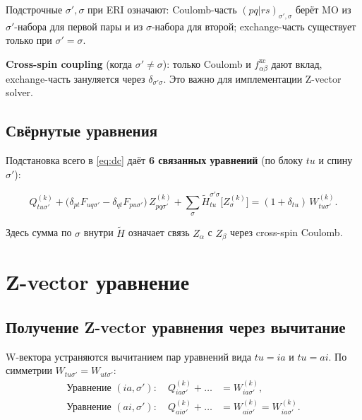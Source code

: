 \documentclass[11pt, a4paper]{article}
\theoremstyle{definition}
\newcommand{\Zk}[2]{Z^{(#1)}_{#2}}
\newcommand{\Wk}[2]{W^{(#1)}_{#2}}
\newcommand{\xc}{\text{xc}}
\begin{document}
Подстрочные $\sigma', \sigma$ при ERI означают: Coulomb-часть $(pq|rs)_{\sigma', \sigma}$ берёт MO из $\sigma'$-набора для первой пары и из $\sigma$-набора для второй; exchange-часть существует только при $\sigma' = \sigma$.

\textbf{Cross-spin coupling} (когда $\sigma' \ne \sigma$): только Coulomb и $f^{\xc}_{\alpha\beta}$ дают вклад, exchange-часть зануляется через $\delta_{\sigma'\sigma}$. Это важно для имплементации Z-vector solver.

\subsection{Свёрнутые уравнения}

Подстановка всего в \eqref{eq:dc} даёт \textbf{6 связанных уравнений} (по блоку $tu$ и спину $\sigma'$):

\begin{equation}
    \boxed{\;
    Q^{(k)}_{tu\sigma'} + \bigl( \delta_{pt} F_{uq\sigma'} - \delta_{qt} F_{pu\sigma'} \bigr)\, \Zk{k}{pq\sigma'} + \sum_\sigma \tilde H^{\sigma'\sigma}_{tu}\bigl[\Zk{k}{\sigma}\bigr] = (1 + \delta_{tu})\, \Wk{k}{tu\sigma'}.
    \;}
    \label{eq:master}
\end{equation}

Здесь сумма по $\sigma$ внутри $\tilde H$ означает связь $Z_\alpha$ с $Z_\beta$ через cross-spin Coulomb.

\section{Z-vector уравнение}
\label{sec:zvector}

\subsection{Получение Z-vector уравнения через вычитание}

W-вектора устраняются вычитанием пар уравнений вида $tu = ia$ и $tu = ai$. По симметрии $W_{tu\sigma'} = W_{ut\sigma'}$:
\begin{align}
    \text{Уравнение } (ia,\sigma'): \quad Q^{(k)}_{ia\sigma'} + \ldots &= W^{(k)}_{ia\sigma'}, \\
    \text{Уравнение } (ai,\sigma'): \quad Q^{(k)}_{ai\sigma'} + \ldots &= W^{(k)}_{ai\sigma'} = W^{(k)}_{ia\sigma'}.
\end{align}
\end{document}
